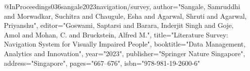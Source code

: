 @InProceedings{036sangale2023navigation/survey,
author="Sangale, Samruddhi
and Morwadkar, Suchitra
and Chaugule, Esha
and Agarwal, Shruti
and Agarwal, Priyanshu",
editor="Goswami, Saptarsi
and Barara, Inderjit Singh
and Goje, Amol
and Mohan, C.
and Bruckstein, Alfred M.",
title="Literature Survey: Navigation System for Visually Impaired People",
booktitle="Data Management, Analytics and Innovation",
year="2023",
publisher="Springer Nature Singapore",
address="Singapore",
pages="667--676",
isbn="978-981-19-2600-6"
}